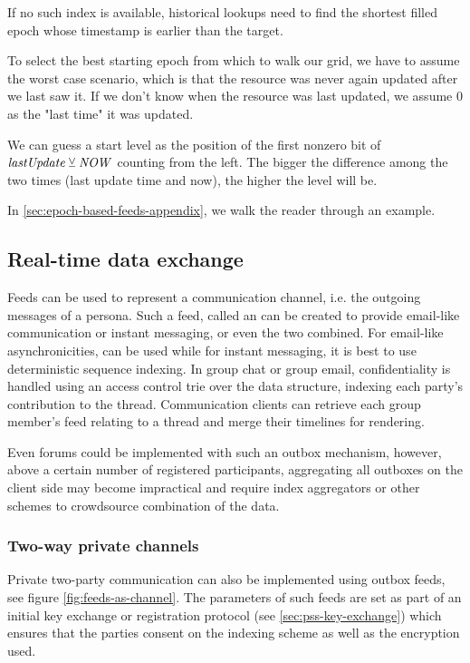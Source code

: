 If no such index is available, historical lookups need to find the shortest filled epoch whose timestamp is earlier than the target. 

To select the best starting epoch from which to walk our grid, we have to assume the worst case scenario, which is that the resource was never again updated after we last saw it. If we don't know when the resource was last updated, we assume 0 as the "last time" it was updated.

We can guess a start level as the position of the first nonzero bit of $\mathit{lastUpdate}\veebar \mathit{NOW}$ counting from the left. The bigger the difference among the two times (last update time and now), the higher the level will be.

In \ref{sec:epoch-based-feeds-appendix}, we walk the reader through an example.

\subsection{Real-time data exchange \statusyellow}\label{sec:feed-as-channel}

Feeds can be used to represent a communication channel, i.e. the outgoing messages of a persona. Such a feed, called an  can be created to provide email-like communication or instant messaging, or even the two combined. For email-like asynchronicities,  can be used while for instant messaging, it is best to use deterministic sequence indexing. 
In group chat or group email, confidentiality is handled using an access control trie over the data structure, indexing each party's contribution to the thread. Communication clients can retrieve each group member's feed relating to a thread and merge their timelines for rendering. 

Even forums could be implemented with such an outbox mechanism, however, above a certain number of registered participants, aggregating all outboxes on the client side may become impractical and require index aggregators or other schemes to crowdsource combination of the data.

\subsubsection{Two-way private channels}
 
Private two-party communication can also be implemented using outbox feeds, see figure \ref{fig:feeds-as-channel}. The parameters of such feeds are set as part of an initial key exchange or registration protocol (see \ref{sec:pss-key-exchange}) which ensures that the parties consent on the indexing scheme as well as the encryption used. 


